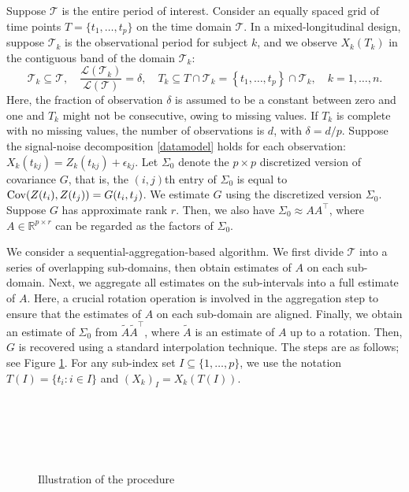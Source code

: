 \documentclass[11pt]{article}
\newcommand{\0}{{\mathbf{0}}}
\newcommand{\1}{{\mathbf{1}}}
\newcommand{\Cov}{{\rm Cov}}
\begin{document}
Suppose $\mathcal{T}$ is the entire period of interest. Consider an equally spaced grid of time points $T = \{t_1,\dots,t_p\}$ on the time domain $\mathcal{T}$. In a mixed-longitudinal design, suppose $\mathcal{T}_k$ is the observational period for subject $k$, and we observe $X_k(T_k)$ in the contiguous band of the domain $\mathcal{T}_k$:
$$\mathcal{T}_k \subseteq \mathcal{T},\quad \frac{ \mathcal{L}(\mathcal{T}_k) }{ \mathcal{L}(\mathcal{T}) }= \delta, \quad T_k \subseteq T\cap \mathcal{T}_k =  \left\{t_1, \ldots, t_p\right\} \cap \mathcal{T}_k, \quad  k = 1,\ldots, n.$$
Here, the fraction of observation $\delta$ is assumed to be a constant between zero and one and $T_k$ might not be consecutive, owing to missing values. If $T_k$ is complete with no missing values, the number of observations is $d$, with $\delta = d/p$. Suppose the signal-noise decomposition \eqref{datamodel} holds for each observation: $X_k(t_{kj}) = Z_k(t_{kj}) + \epsilon_{kj}$. Let $\Sigma_0$ denote the $p\times p$ discretized version of covariance $G$, that is, the $(i,j)$th entry of $\Sigma_0$ is equal to $\Cov(Z(t_i), Z(t_j)) = G(t_i, t_j)$. We estimate $G$ using the discretized version $\Sigma_0$. Suppose $G$ has approximate rank $r$. 
Then, we also have $\Sigma_0 \approx AA^\top$, where $A\in \mathbb{R}^{p\times r}$ can be regarded as the factors of $\Sigma_0$. 

We consider a sequential-aggregation-based algorithm. We first divide $\mathcal{T}$ into a series of overlapping sub-domains, then obtain estimates of $A$ on each sub-domain. Next, we aggregate all estimates on the sub-intervals into a full estimate of $A$. Here, a crucial rotation operation is involved in the aggregation step to ensure that the estimates of $A$ on each sub-domain are aligned.  Finally, we obtain an estimate of $\Sigma_0$ from $\tilde{A}\tilde{A}^\top$, where $\tilde{A}$ is an estimate of $A$ up to a rotation. Then, $G$ is recovered using a standard interpolation technique. The steps are as follows; see Figure \ref{fig:procedure}. For any sub-index set $I\subseteq \{1,\dots,p\}$, we use the notation $T(I) = \{t_i: i \in I\}$ and $(X_k)_{I} = X_k(T(I))$.
\begin{figure}\label{fig:procedure}
	\begin{center}
		\\
		\\
		\\
		\\		
	\end{center}
	\caption{Illustration of the procedure}
\end{figure}
\end{document}
